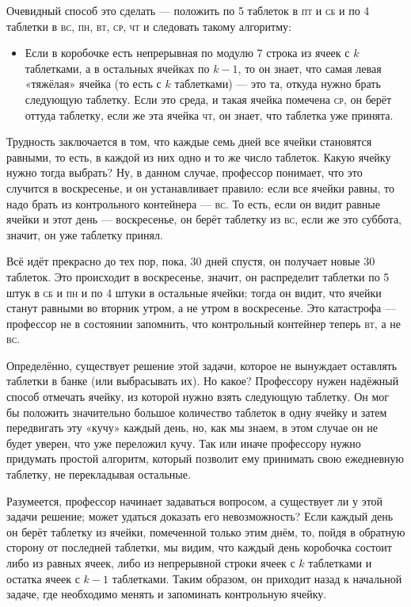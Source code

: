 Очевидный способ это сделать --- положить по 5 таблеток в \textsc{пт} и \textsc{сб} и по 4 таблетки в \textsc{вс}, \textsc{пн}, \textsc{вт}, \textsc{ср}, \textsc{чт} и следовать такому алгоритму:
\begin{itemize}
 \item[]
 Если в коробочке есть непрерывная по модулю 7 строка из ячеек с $k$ таблетками, а в остальных ячейках по $k-1$, то он знает, что самая левая «тяжёлая» ячейка (то есть с $k$ таблетками) --- это та, откуда нужно брать следующую таблетку.
Если это среда, и такая ячейка помечена \textsc{ср}, он берёт оттуда таблетку, если же эта ячейка \textsc{чт}, он знает, что таблетка уже принята.
\end{itemize}

Трудность заключается в том, что каждые семь дней все ячейки становятся равными, то есть, в каждой из них одно и то же число таблеток.
Какую ячейку нужно тогда выбрать?
Ну, в данном случае, профессор понимает, что это случится в воскресенье, и он устанавливает правило: если все ячейки равны, то надо брать из контрольного контейнера --- \textsc{вс}.
То есть, если он видит равные ячейки и этот день --- воскресенье, он берёт таблетку из \textsc{вс}, если же это суббота, значит, он уже таблетку принял.

Всё идёт прекрасно до тех пор, пока, 30 дней спустя, он получает новые 30 таблеток.
Это происходит в воскресенье, значит, он распределит таблетки по 5 штук в \textsc{сб} и \textsc{пн} и по 4 штуки в остальные ячейки;
тогда он видит, что ячейки станут равными во вторник утром, а не утром в воскресенье.
Это катастрофа --- профессор не в состоянии запомнить, что контрольный контейнер теперь \textsc{вт}, а не \textsc{вс}.

Определённо, существует решение этой задачи, которое не вынуждает оставлять таблетки в банке (или выбрасывать их).
Но какое? Профессору нужен надёжный способ отмечать ячейку, из которой нужно взять следующую таблетку.
Он мог бы положить значительно большое количество таблеток в одну ячейку и затем передвигать эту «кучу» каждый день, но, как мы знаем, в этом случае он не будет уверен, что уже переложил кучу.
Так или иначе профессору нужно придумать простой алгоритм, который позволит ему принимать свою ежедневную таблетку, не перекладывая остальные.

Разумеется, профессор начинает задаваться вопросом, а существует ли у этой задачи решение;
может удаться доказать его невозможность?
Если каждый день он берёт таблетку из ячейки, помеченной только этим днём, то, пойдя в обратную сторону от последней таблетки, мы видим, что каждый день коробочка состоит либо из равных ячеек, либо из непрерывной строки ячеек с $k$ таблетками и остатка ячеек с $k-1$ таблетками.
Таким образом, он приходит назад к начальной задаче, где необходимо менять и запоминать контрольную ячейку.

